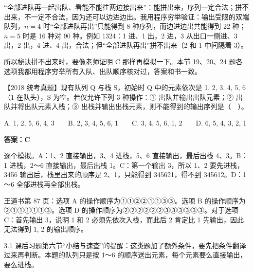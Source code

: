 \documentclass[10.5pt,a4paper,oneside]{article}
\newcommand{\hlred}[1]{\textcolor{wdred}{\bfseries #1}}
\newcommand{\uln}[1]{\CJKunderline[format=\color{wdred},thickness=0.9pt,depth=0.28em]{#1}}
\begin{document}
\begin{addbox}

“全部进队再一起出队、看能不能往两边接出来”\uln{只是充分条件}：能拼出来，序列一定合法；拼不出来，不一定不合法，因为还可以边进边出。我用程序穷举验证：输出受限的双端队列，\(n=4\)
时“全部进队再出”只能得到 8 种序列，而边进边出共能得到 22 种；\(n=5\)
时是 16 种对 90 种。例如 1324：1 进、1 出，2 进，3 从出口一侧进、3 出，2
出，4 进、4 出，合法；但“全部进队再出”拼不出来（2 和 1 中间隔着 3）。

所以秘诀拼不出来时，要像老师证明 C 那样再模拟一下。本节 19、20、24
题各选项我都用程序穷举所有入队、出队顺序核对过，答案和书一致。

\end{addbox}

\begin{questionbox}[23]

【2018 统考真题】现有队列 Q 与栈 S，初始时 Q 中的元素依次是 1, 2, 3, 4,
5, 6（1 在队头），S 为空。若仅允许下列 3 种操作：① 出队并输出出队元素；②
出队并将出队元素入栈；③
出栈并输出出栈元素，则不能得到的输出序列是（　）。

A. 1, 2, 5, 6, 4, 3　　B. 2, 3, 4, 5, 6, 1　　C. 3, 4, 5, 6, 1, 2　　D.
6, 5, 4, 3, 2, 1

\end{questionbox}

\hlred{\textbf{答案：C}}

\begin{videobox}

逐个模拟。A：1、2 直接输出，3、4 进栈，5、6 直接输出，最后出栈
4、3。B：1 进栈，2～6 直接输出，最后出栈 1。C：第一个输出 3，所以 1、2
要先进栈，3456 输出后，栈里出来的顺序是 2、1，只能得到 345621，得不到
345612。D：1～6 全部进栈再全部出栈。

\end{videobox}

\begin{jiexibox}

王道书第 87 页：选项 A 的操作顺序为①①②②①①③③。选项 B
的操作顺序为②①①①①①③。选项 D 的操作顺序为②②②②②②③③③③③③。对于选项
C：首先输出 3，说明 1 和 2 必须先依次入栈，而此后 2 肯定比 1
先输出，因此无法得到 1, 2 的输出顺序。

\end{jiexibox}

\begin{recallbox}

3.1
课后习题第六节“小结与速查”的提醒：这类题加了额外条件，要先把条件翻译过来再判断。本题的队列只是按
1～6 的顺序送出元素，每个元素要么直接输出，要么进栈。

\end{recallbox}
\end{document}
